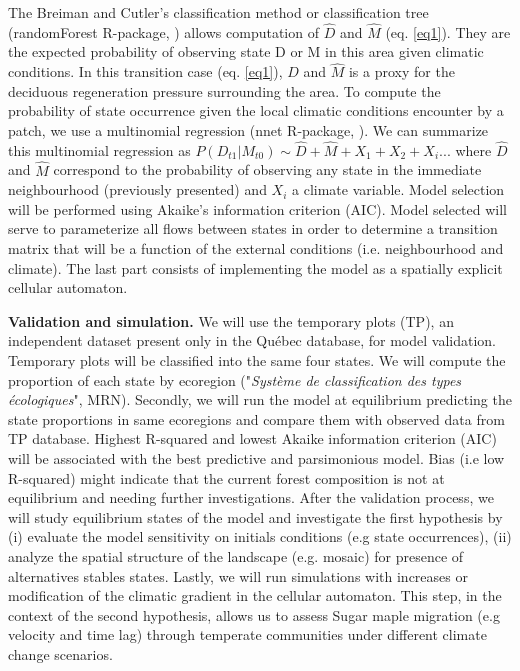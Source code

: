 The Breiman and Cutler's classification method or classification tree
(randomForest R-package, \cite{Liaw2002a}) allows computation of $\hat{D}$ and
$\hat{M}$ (eq. \ref{eq1}). They are the expected probability of observing
state D or M in this area given climatic conditions. In this transition case
(eq. \ref{eq1}), $\hat{D}$ and $\hat{M}$ is a proxy for the deciduous
regeneration pressure surrounding the area. To compute the probability of
state occurrence given the local climatic conditions encounter by a patch, we
use a multinomial regression (nnet R-package, \cite{Venables2002}). We can
summarize this multinomial regression as $P(D_{t1}|M_{t0}) \sim \hat{D} +
\hat{M} + X_1+X_2+X_i... $ where $\hat{D}$ and $\hat{M}$ correspond to the
probability of observing any state in the immediate neighbourhood (previously
presented) and $X_i$ a climate variable. Model selection will be performed using
Akaike's information criterion (AIC). Model selected will serve to parameterize
all flows between states in order to determine a transition matrix that will
be a function of the external conditions (i.e. neighbourhood and climate). 
The last part consists of implementing the model as a spatially explicit cellular
automaton. %


\textbf{Validation and simulation.} We will use the temporary plots (TP), an
independent  dataset present only in the Québec database, for model
validation. Temporary plots will be classified into the same four states. We
will compute the proportion of each state by ecoregion ("\textit{Système de
classification des types écologiques}", MRN). Secondly, we will run the model
at equilibrium predicting the state proportions in same ecoregions and compare
them with observed data from TP database. Highest R-squared and lowest Akaike
information criterion (AIC) will be associated with the best predictive and
parsimonious model. Bias (i.e low R-squared) might indicate that the current
forest composition is not at equilibrium and needing further investigations.
After the validation process, we will study equilibrium states of the model
and investigate the first hypothesis by (i) evaluate the model sensitivity on
initials conditions (e.g state occurrences), (ii) analyze the spatial
structure of the landscape (e.g. mosaic) for presence of alternatives stables
states. Lastly, we will run simulations with increases or modification of the
climatic gradient in the cellular automaton. This step, in the context of the
second hypothesis, allows us to assess Sugar maple migration (e.g velocity and
time lag) through  temperate communities under different climate change
scenarios.


\clearpage
\small

